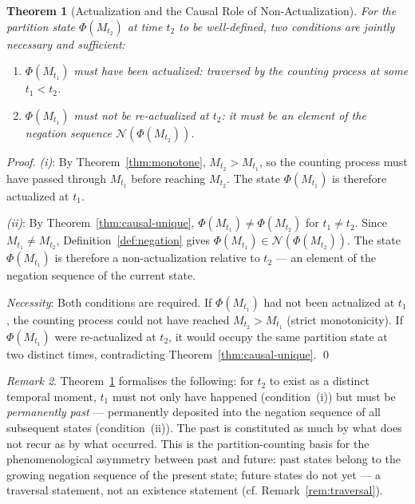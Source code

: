 \documentclass[twocolumn,10pt,a4paper]{article}
\theoremstyle{thmstyle}
\newtheorem{theorem}{Theorem}[section]
\theoremstyle{definition}
\theoremstyle{remark}
\newtheorem{remark}[theorem]{Remark}
\newcommand{\PhiMap}{\varPhi}
\begin{document}
\begin{theorem}[Actualization and the Causal Role of Non-Actualization]
\label{thm:causal-negation}
For the partition state $\PhiMap(M_{t_2})$ at time $t_2$ to be well-defined, two conditions are jointly necessary and sufficient:
\begin{enumerate}[leftmargin=1.5em,label=(\roman*),itemsep=0.1em]
\item $\PhiMap(M_{t_1})$ must have been actualized: traversed by the counting process at some $t_1 < t_2$.
\item $\PhiMap(M_{t_1})$ must not be re-actualized at $t_2$: it must be an element of the negation sequence $\mathcal{N}(\PhiMap(M_{t_2}))$.
\end{enumerate}
\end{theorem}

\begin{proof}
\textit{(i)}: By Theorem~\ref{thm:monotone}, $M_{t_2} > M_{t_1}$, so the counting process must have passed through $M_{t_1}$ before reaching $M_{t_2}$. The state $\PhiMap(M_{t_1})$ is therefore actualized at $t_1$.

\textit{(ii)}: By Theorem~\ref{thm:causal-unique}, $\PhiMap(M_{t_1}) \neq \PhiMap(M_{t_2})$ for $t_1 \neq t_2$. Since $M_{t_1} \neq M_{t_2}$, Definition~\ref{def:negation} gives $\PhiMap(M_{t_1}) \in \mathcal{N}(\PhiMap(M_{t_2}))$. The state $\PhiMap(M_{t_1})$ is therefore a non-actualization relative to $t_2$ --- an element of the negation sequence of the current state.

\textit{Necessity}: Both conditions are required. If $\PhiMap(M_{t_1})$ had not been actualized at $t_1$, the counting process could not have reached $M_{t_2} > M_{t_1}$ (strict monotonicity). If $\PhiMap(M_{t_1})$ were re-actualized at $t_2$, it would occupy the same partition state at two distinct times, contradicting Theorem~\ref{thm:causal-unique}. \qed
\end{proof}

\begin{remark}
Theorem~\ref{thm:causal-negation} formalises the following: for $t_2$ to exist as a distinct temporal moment, $t_1$ must not only have happened (condition~(i)) but must be \emph{permanently past} --- permanently deposited into the negation sequence of all subsequent states (condition~(ii)). The past is constituted as much by what does not recur as by what occurred. This is the partition-counting basis for the phenomenological asymmetry between past and future: past states belong to the growing negation sequence of the present state; future states do not yet --- a traversal statement, not an existence statement (cf. Remark~\ref{rem:traversal}).
\end{remark}
\end{document}

